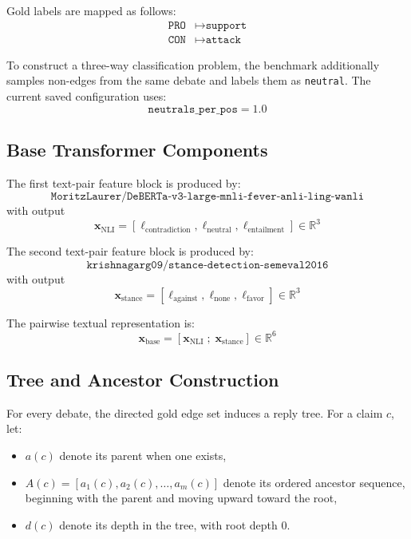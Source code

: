 \documentclass[11pt,a4paper]{article}
\begin{document}
Gold labels are mapped as follows:
\begin{align*}
\texttt{PRO} &\mapsto \texttt{support} \\
\texttt{CON} &\mapsto \texttt{attack}
\end{align*}

To construct a three-way classification problem, the benchmark additionally samples non-edges from the same debate and labels them as \texttt{neutral}. The current saved configuration uses:
\[
\texttt{neutrals\_per\_pos} = 1.0
\]

\subsection{Base Transformer Components}
The first text-pair feature block is produced by:
\[
\texttt{MoritzLaurer/DeBERTa-v3-large-mnli-fever-anli-ling-wanli}
\]
with output
\begin{equation}
\mathbf{x}_{\text{NLI}} =
\left[
\ell_{\text{contradiction}},
\ell_{\text{neutral}},
\ell_{\text{entailment}}
\right]
\in \mathbb{R}^{3}
\end{equation}

The second text-pair feature block is produced by:
\[
\texttt{krishnagarg09/stance-detection-semeval2016}
\]
with output
\begin{equation}
\mathbf{x}_{\text{stance}} =
\left[
\ell_{\text{against}},
\ell_{\text{none}},
\ell_{\text{favor}}
\right]
\in \mathbb{R}^{3}
\end{equation}

The pairwise textual representation is:
\begin{equation}
\mathbf{x}_{\text{base}} =
\left[
\mathbf{x}_{\text{NLI}} \; ; \; \mathbf{x}_{\text{stance}}
\right]
\in \mathbb{R}^{6}
\end{equation}

\subsection{Tree and Ancestor Construction}
For every debate, the directed gold edge set induces a reply tree. For a claim \(c\), let:
\begin{itemize}[leftmargin=1.5em]
  \item \(a(c)\) denote its parent when one exists,
  \item \(A(c) = [a_1(c), a_2(c), \dots, a_m(c)]\) denote its ordered ancestor sequence, beginning with the parent and moving upward toward the root,
  \item \(d(c)\) denote its depth in the tree, with root depth \(0\).
\end{itemize}
\end{document}
